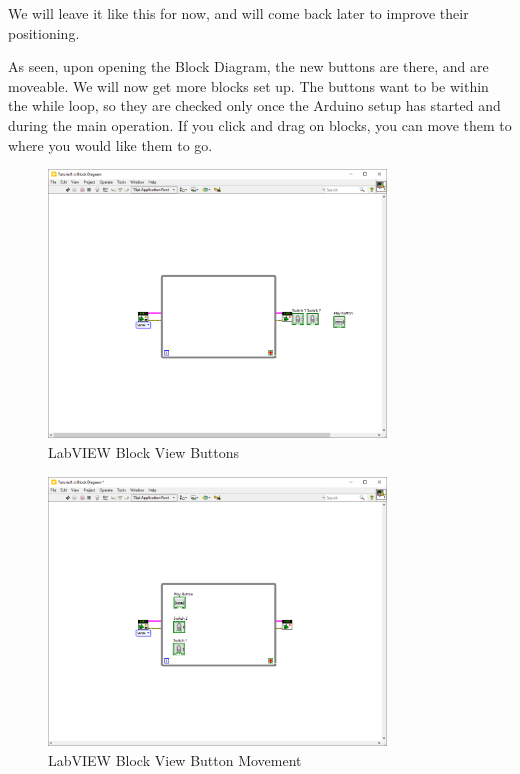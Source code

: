 \documentclass[a4paper,11pt]{report}
\begin{document}
We will leave it like this for now, and will come back later to improve their positioning.

As seen, upon opening the Block Diagram, the new buttons are there, and are moveable. We will now get more blocks set up. The buttons want to be within the while loop, so they are checked only once the Arduino setup has started and during the main operation. If you click and drag on blocks, you can move them to where you would like them to go.

\begin{figure}[H]
\centering
\includegraphics[width=0.8\textwidth]{screenshots/labview15}
\caption{LabVIEW Block View Buttons}
\end{figure}

\begin{figure}[H]
\centering
\includegraphics[width=0.8\textwidth]{screenshots/labview16}
\caption{LabVIEW Block View Button Movement}
\end{figure}
\end{document}
